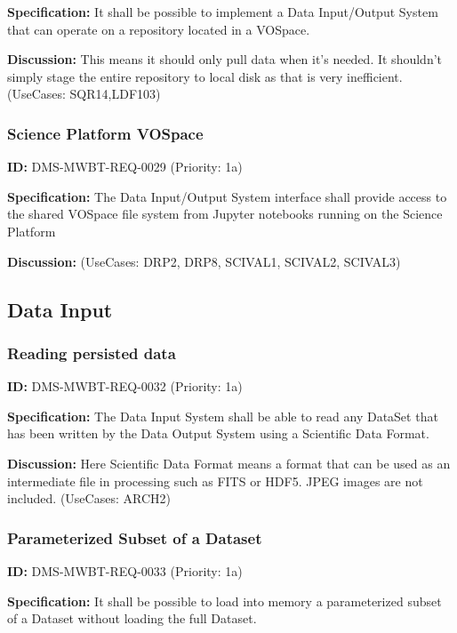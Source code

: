 \documentclass[SE,toc,lsstdraft]{lsstdoc}
\begin{document}
\textbf{Specification:}
It shall be possible to implement a Data Input/Output System that can operate on a repository located in a VOSpace.

\textbf{Discussion:}
This means it should only pull data when it's needed. It shouldn't simply stage the entire repository to local disk as that is very inefficient. (UseCases: SQR14,LDF103)

\subsubsection{Science Platform VOSpace}

\label{DMS-MWBT-REQ-0029}
\textbf{ID:} DMS-MWBT-REQ-0029 (Priority: 1a)

\textbf{Specification:}
The Data Input/Output System interface shall provide access to the shared VOSpace file system from Jupyter notebooks running on the Science Platform

\textbf{Discussion:}
(UseCases: DRP2, DRP8, SCIVAL1, SCIVAL2, SCIVAL3)

\subsection{Data Input}

\subsubsection{Reading persisted data}

\label{DMS-MWBT-REQ-0032}
\textbf{ID:} DMS-MWBT-REQ-0032 (Priority: 1a)

\textbf{Specification:}
The Data Input System shall be able to read any DataSet that has been written by the Data Output System using a Scientific Data Format.

\textbf{Discussion:}
Here Scientific Data Format means a format that can be used as an intermediate file in processing such as FITS or HDF5. JPEG images are not included. (UseCases: ARCH2)

\subsubsection{Parameterized Subset of a Dataset}

\label{DMS-MWBT-REQ-0033}
\textbf{ID:} DMS-MWBT-REQ-0033 (Priority: 1a)

\textbf{Specification:}
It shall be possible to load into memory a parameterized subset of a Dataset without loading the full Dataset.
\end{document}
